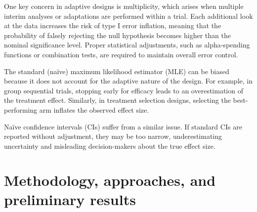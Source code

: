 \documentclass[12pt,a4paper]{article}
\begin{document}
One key concern in adaptive designs is multiplicity, which arises when multiple interim analyses or adaptations are performed within a trial. Each additional look at the data increases the risk of type I error inflation, meaning that the probability of falsely rejecting the null hypothesis becomes higher than the nominal significance level. Proper statistical adjustments, such as alpha-spending functions or combination tests, are required to maintain overall error control.

The standard (naïve) maximum likelihood estimator (MLE) can be biased because it does not account for the adaptive nature of the design. For example, in group sequential trials, stopping early for efficacy leads to an overestimation of the treatment effect. Similarly, in treatment selection designs, selecting the best-performing arm inflates the observed effect size.

Naïve confidence intervals (CIs) suffer from a similar issue. If standard CIs are reported without adjustment, they may be too narrow, underestimating uncertainty and misleading decision-makers about the true effect size.







\section{Methodology, approaches, and preliminary results}
\end{document}
